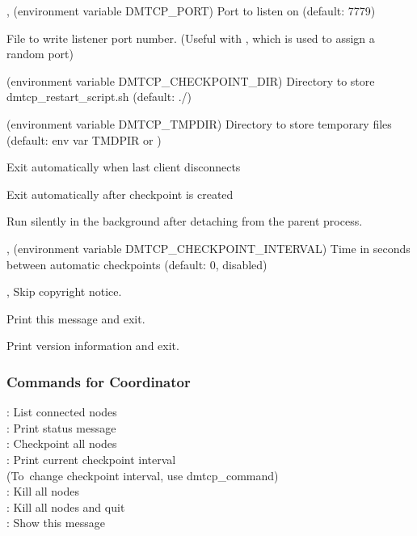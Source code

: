 \begin{Description}
  \item[\Opt{-p}, \OptSArg{--port}{port} (environment variable DMTCP_PORT)]
    Port to listen on (default: 7779)

  \item[\OptSArg{--port-file}{filename}]
    File to write listener port number.
    (Useful with , which is used to assign a random port)

  \item[\OptSArg{--ckptdir}{path} (environment variable DMTCP_CHECKPOINT_DIR)]
    Directory to store dmtcp_restart_script.sh (default: ./)

  \item[\OptSArg{--tmpdir}{path} (environment variable DMTCP_TMPDIR)]
    Directory to store temporary files (default: env var TMDPIR or )

  \item[\Opt{--exit-on-last}] Exit automatically when last client disconnects

  \item[\Opt{--exit-after-ckpt}] Exit automatically after checkpoint is created

  \item[\Opt{--daemon}]
    Run silently in the background after detaching from the parent process.

  \item[\Opt{-i}, \OptSArg{--interval}{<val>} (environment variable DMTCP_CHECKPOINT_INTERVAL)]
    Time in seconds between automatic checkpoints (default: 0, disabled)

  \item[\Opt{-q}, \Opt{--quiet}] Skip copyright notice.

  \item[\Opt{--help}] Print this message and exit.

  \item[\Opt{--version}] Print version information and exit.
\end{Description}

\subsubsection{Commands for Coordinator}

: List connected nodes\\
: Print status message\\
: Checkpoint all nodes\\
: Print current checkpoint interval\\
\SP\SP\SP(To\ change checkpoint interval, use dmtcp_command)\\
: Kill all nodes\\
: Kill all nodes and quit\\
: Show this message\\
